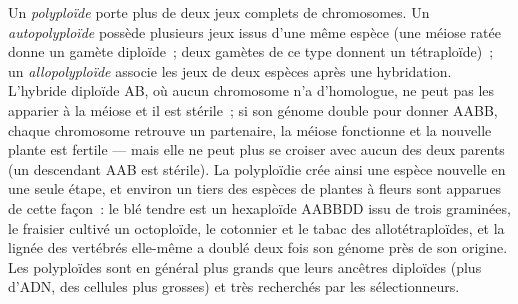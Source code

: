 \begin{definition}[La polyploïdie]\label{def:b2:genome-diversification:polyploidy}
Un \emph{polyploïde} porte plus de deux jeux complets de chromosomes.
Un \emph{autopolyploïde} possède plusieurs jeux issus d'une même espèce
(une méiose ratée donne un gamète diploïde~; deux gamètes de ce type
donnent un tétraploïde)~; un \emph{allopolyploïde} associe les jeux de
deux espèces après une hybridation. L'hybride diploïde AB, où aucun
chromosome n'a d'homologue, ne peut pas les apparier à la méiose et il
est stérile~; si son génome double pour donner AABB, chaque chromosome
retrouve un partenaire, la méiose fonctionne et la nouvelle plante est
fertile --- mais elle ne peut plus se croiser avec aucun des deux
parents (un descendant AAB est stérile). La polyploïdie crée ainsi une
espèce nouvelle en une seule étape, et environ un tiers des espèces de
plantes à fleurs sont apparues de cette façon~: le blé tendre est un
hexaploïde AABBDD issu de trois graminées, le fraisier cultivé un
octoploïde, le cotonnier et le tabac des allotétraploïdes, et la lignée
des vertébrés elle-même a doublé deux fois son génome près de son
origine. Les polyploïdes sont en général plus grands que leurs ancêtres
diploïdes (plus d'ADN, des cellules plus grosses) et très recherchés par
les sélectionneurs.
\end{definition}


